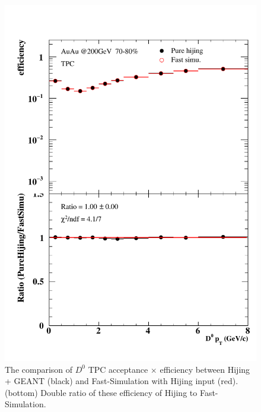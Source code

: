 \begin{figure}[htbp]
\begin{minipage}[htbp]{0.47\linewidth}
\includegraphics[width=1.0\textwidth,angle=0]{figure/Run14_D0HFT/70_80_1.pdf} 
\caption{ The comparison of $D^0$ TPC acceptance $\times$ efficiency between Hijing + GEANT (black) and Fast-Simulation with Hijing input (red). (bottom) Double ratio of these efficiency of Hijing to Fast-Simulation.\label{70_80_1}}
\end{minipage}
\end{figure}

